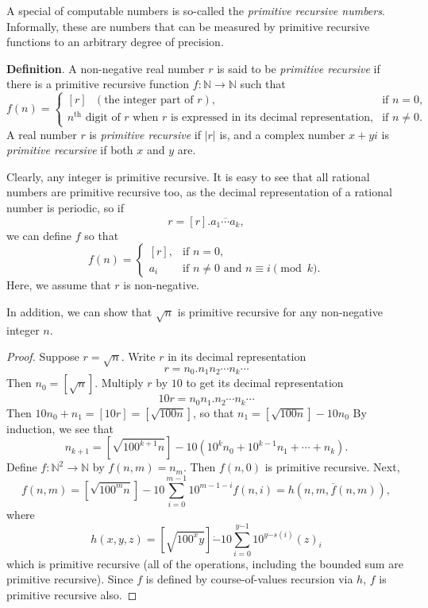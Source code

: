\documentclass[12pt]{article}
\begin{document}
A special  of computable numbers is so-called the \emph{primitive recursive numbers}.  Informally, these are numbers that can be measured by primitive recursive functions to an arbitrary degree of precision.

\textbf{Definition}.  A non-negative real number $r$ is said to be \emph{primitive recursive} if there is a primitive recursive function $f:\mathbb{N} \to \mathbb{N}$ such that 
\begin{displaymath}
f(n) = \left\{
\begin{array}{ll}
[r] \textrm{  }(\textrm{the integer part of }r), & \textrm{if } n=0, \\
n^\textrm{th}\textrm{ digit of }r\textrm{ when }r\textrm{ is expressed in its decimal representation,} & \textrm{if } n\ne 0.
\end{array}
\right.
\end{displaymath}
A real number $r$ is \emph{primitive recursive} if $|r|$ is, and a complex number $x+yi$ is \emph{primitive recursive} if both $x$ and $y$ are.

Clearly, any integer is primitive recursive.  It is easy to see that all rational numbers are primitive recursive too, as the decimal representation of a rational number is periodic, so if $$r=[r].\overline{a_1\cdots a_k},$$ we can define $f$ so that
\begin{displaymath}
f(n) = \left\{
\begin{array}{ll}
[r] , & \textrm{if } n=0, \\
a_i & \textrm{if } n\ne 0 \mbox{ and } n \equiv i \pmod k.
\end{array}
\right.
\end{displaymath}
Here, we assume that $r$ is non-negative.

In addition, we can show that $\sqrt{n}$ is primitive recursive for any non-negative integer $n$.
\begin{proof}  Suppose $r=\sqrt{n}$.  Write $r$ in its decimal representation $$r=n_0.n_1 n_2 \cdots n_k \cdots$$
Then $n_0=[\sqrt{n}]$.  Multiply $r$ by $10$ to get its decimal representation $$10r = n_0 n_1.n_2 \cdots n_k \cdots $$
Then $10n_0 + n_1 = [10r]=[\sqrt{100 n}]$, so that $n_1 = [\sqrt{100n}]-10n_0$  By induction, we see that
$$n_{k+1} = [\sqrt{100^{k+1} n} ] - 10 (10^k n_0 + 10^{k-1} n_1 + \cdots + n_k).$$
Define $f:\mathbb{N}^2 \to \mathbb{N}$ by $f(n,m)=n_m$.  Then $f(n,0)$ is primitive recursive.  Next, $$f(n,m)= [\sqrt{100^m n} ]- 10 \sum_{i=0}^{m-1} 10^{m-1-i} f(n,i) = h(n,m, \overline{f}(n,m)),$$ where $$h(x,y,z)= [\sqrt{100^x y} ] \dot{-} 10 \sum_{i=0}^{y \dot{-} 1} 10^{y \dot{-} s(i) } (z)_i $$
which is primitive recursive (all of the operations, including the bounded sum are primitive recursive).  Since $f$ is defined by course-of-values recursion via $h$, $f$ is primitive recursive also.
\end{proof}
\end{document}
